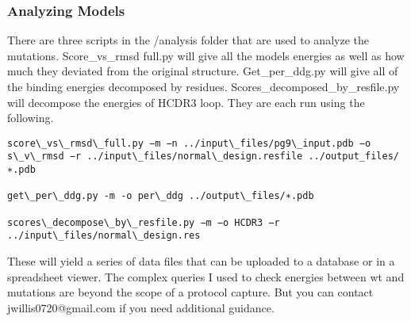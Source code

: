 \subsubsection{Analyzing Models}
There are three scripts in the /analysis folder that are used to analyze the mutations. Score\_vs\_rmsd full.py will give all the models energies as well as how much they deviated from the original structure. Get\_per\_ddg.py will give all of the binding energies decomposed by residues. Scores\_decomposed\_by\_resfile.py will decompose the energies of HCDR3 loop. They are each run using the following.

\begin{lstlisting}[breaklines=true]
score\_vs\_rmsd\_full.py −m −n ../input\_files/pg9\_input.pdb −o s\_v\_rmsd −r ../input\_files/normal\_design.resfile ../output_files/∗.pdb

get\_per\_ddg.py -m -o per\_ddg ../output\_files/∗.pdb

scores\_decompose\_by\_resfile.py −m −o HCDR3 −r ../input\_files/normal\_design.res
\end{lstlisting}

These will yield a series of data files that can be uploaded to a database or in a spreadsheet viewer. The complex queries I used to check energies between wt and mutations are beyond the scope of a protocol capture. But you can contact jwillis0720@gmail.com if you need additional guidance.



